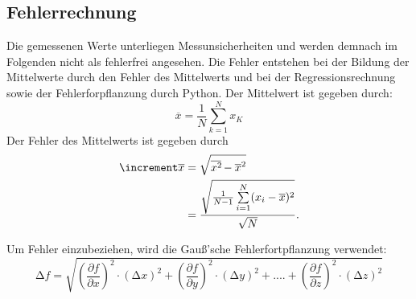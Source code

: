\subsection{Fehlerrechnung}
\label{subsec:fehler}
Die gemessenen Werte unterliegen Messunsicherheiten und werden demnach im
Folgenden nicht als fehlerfrei angesehen. Die Fehler entstehen bei der
Bildung der Mittelwerte durch den Fehler des Mittelwerts und bei der
Regressionsrechnung sowie der Fehlerforpflanzung durch Python.
Der Mittelwert ist gegeben durch:
\begin{equation}
    \overline{x} = \frac{1}{N} \sum\limits_{k=1}^N x_K
\end{equation}
Der Fehler des Mittelwerts ist gegeben durch 
\begin{equation}
    \begin{aligned}
        \increment \overline{x} &= \sqrt{\overline{x^2\kern-0.1em} - \overline{x}^2} \\
                            &= \frac{\sqrt{\frac{1}{N-1} \sum\limits_{i=1}^N (x_i - \overline{x})^2}}{\sqrt{N}}.
    \end{aligned}
\end{equation}

Um Fehler einzubeziehen, wird die Gauß'sche Fehlerfortpflanzung verwendet:
\begin{equation}
    \label{eqn:9}
    \increment f = \sqrt{\left(\frac{\partial f}{\partial x}\right)^2 \cdot \left(\increment x\right)^2 + \left(\frac{\partial f}{\partial y}\right)^2 \cdot \left(\increment y\right)^2 + .... + \left(\frac{\partial f}{\partial z}\right)^2 \cdot \left(\increment z\right)^2}
\end{equation}